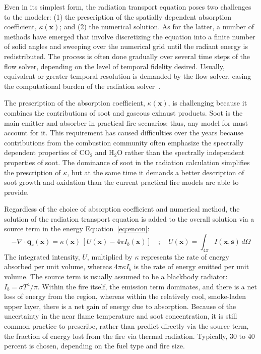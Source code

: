 \documentclass[graybox]{svmult}
\begin{document}
Even in its simplest form, the radiation transport equation poses two challenges to the modeler: (1) the prescription of the spatially dependent absorption coefficient, $\kappa(\mathbf{x})$; and (2) the numerical solution. As for  the latter, a number of methods have emerged that involve discretizing the equation into a finite number of solid angles and sweeping over the numerical grid  until the radiant energy is redistributed. The process is often done gradually over several time steps of the flow solver, depending on the level of temporal fidelity desired. Usually, equivalent or greater temporal resolution is demanded by the flow solver, easing the computational burden of the radiation solver~\cite{Hostikka}.

The prescription of the absorption coefficient, $\kappa(\mathbf{x})$, is challenging because it combines the contributions of soot and gaseous exhaust products. Soot is the main emitter and absorber in practical fire scenarios; thus, any model for must account for it. This requirement has caused difficulties over the years because contributions from the combustion community often  emphasize the spectrally dependent properties of CO$_2$ and H$_2$O rather than the spectrally independent properties of soot. The dominance of soot in the  radiation calculation simplifies the prescription of $\kappa$, but at the same time it demands a better description of soot growth and oxidation than the current practical fire models are able to provide.

Regardless of the choice of absorption coefficient and numerical method, the solution of the radiation transport equation is added to the overall solution via a source term in the energy Equation~\ref{eq:encon}:
\begin{equation}
-\nabla \cdot \mathbf{q}_r(\mathbf{x}) = \kappa(\mathbf{x}) \, \left[ U(\mathbf{x}) - 4 \pi I_b(\mathbf{x}) \right] \quad ; \quad U(\mathbf{x}) = \int_{4\pi} I(\mathbf{x},\mathbf{s}) \, d\Omega
\label{eq:radterm}
\end{equation}
The integrated intensity, $U$, multiplied by $\kappa$ represents the rate of energy absorbed per unit volume, whereas $4 \pi \kappa I_b$ is the rate of energy emitted per unit volume. The source term is usually assumed to be a blackbody radiator: $I_b=\sigma T^4/\pi$. Within the fire itself, the emission term dominates, and there is a net loss of energy from the region, whereas within the relatively cool, smoke-laden upper layer, there is a net gain of energy due to absorption. Because of the uncertainty in the near flame temperature and soot concentration, it is still common practice to prescribe, rather than predict directly via the source term, the fraction of energy lost from the fire via thermal radiation. Typically, 30 to 40 percent is chosen, depending on the fuel type and fire size.
\end{document}
